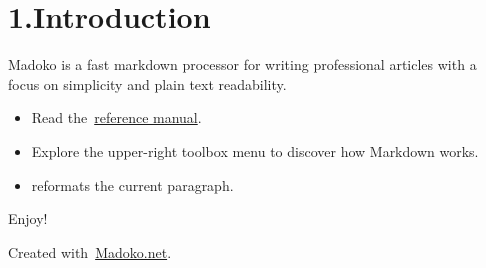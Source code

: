 \documentclass{article}
\begin{document}
\mdxtitleblockstart{}
\mdxauthorstart{}
\mdxauthorend\mdtitleauthorrunning{}{}\mdxtitleblockend%

\section{1.\hspace*{0.5em}Introduction}\label{sec-introduction}%

\noindent{}Madoko is a fast markdown processor for writing professional articles
with a focus on simplicity and plain text readability.%

\begin{itemize}[noitemsep,topsep=\mdcompacttopsep]%

\item{}Read the~\href{http://research.microsoft.com/en-us/um/people/daan/madoko/doc/reference.html}{reference manual}.%

\item{}Explore the upper-right toolbox menu to discover how Markdown works.%

\item{} reformats the current paragraph.%
\end{itemize}%

\noindent{}Enjoy!%

\begin{mdbmargintb}{4em}{}%
\begin{mdflushright}%
{\tiny{}Created with~\href{https://www.madoko.net}{Madoko.net}.}%
\end{mdflushright}%
\end{mdbmargintb}%
\end{document}

